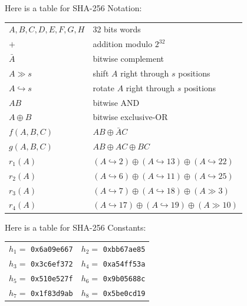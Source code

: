 \documentclass[12pt,titlepage]{article}
\begin{document}
Here is a table for SHA-256 Notation: \begin{center}
\begin{tabular}{ll}
	$A,B,C,D,E,F,G,H$     & 32 bits words                                                                       \\
	$+$                   & addition modulo $2^{32}$                                                            \\
	$\bar{A}$             & bitwise complement                                                                  \\
	$A \gg s$             & shift $A$ right through $s$ positions                                               \\
	$A \hookrightarrow s$ & rotate $A$ right through $s$ positions                                              \\
	$AB$                  & bitwise AND                                                                         \\
	$A \oplus B$          & bitwise exclusive-OR                                                                \\
	$f(A,B,C)$            & $AB \oplus \bar{A}C$                                                                \\
	$g(A,B,C)$            & $AB \oplus AC \oplus BC$                                                            \\
	$r_1(A)$              & $(A \hookrightarrow 2) \oplus (A \hookrightarrow 13) \oplus (A \hookrightarrow 22)$ \\
	$r_2(A)$              & $(A \hookrightarrow 6) \oplus (A \hookrightarrow 11) \oplus (A \hookrightarrow 25)$ \\
	$r_3(A)$              & $(A \hookrightarrow 7) \oplus (A \hookrightarrow 18) \oplus (A \gg 3)$              \\
	$r_4(A)$              & $(A \hookrightarrow 17) \oplus (A \hookrightarrow 19) \oplus (A \gg 10)$            \\
\end{tabular}
\end{center}

Here is a table for SHA-256 Constants: \begin{center}
\begin{tabular}{ll}
	$h_1 = $ \texttt{0x6a09e667} & $h_2 = $ \texttt{0xbb67ae85} \\
	$h_3 = $ \texttt{0x3c6ef372} & $h_4 = $ \texttt{0xa54ff53a} \\
	$h_5 = $ \texttt{0x510e527f} & $h_6 = $ \texttt{0x9b05688c} \\
	$h_7 = $ \texttt{0x1f83d9ab} & $h_8 = $ \texttt{0x5be0cd19} \\
\end{tabular}
\end{center}
\end{document}
